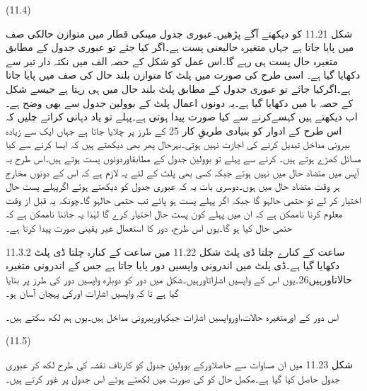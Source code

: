  
(11.4)
 
	شکل 11.21 کو دیکھتے آگے پڑھیں۔عبوری جدول میںکی قطار میں متوازن حالکی صف میں پایا جاتا ہے جہاں متغیرہ حالیعنی پست ہے۔اگر کیا جئے تو عبوری جدول کے مطابق متغیرہ حال پست ہی رہے گا۔اس عمل کو شکل کے حصہ الف میں نکتہ دار تیر سے دکھایا گیا ہے۔
	اسی طرح  کی صورت میں پلٹ کا متوازن بلند حال  کی صف میں پایا جاتا ہے۔اگرکیا جائے تو عبوری جدول کے مطابق پلٹ بلند حال میں ہی رہتا ہے جیسے شکل کے حصہ با میں دکھایا گیا ہے۔یہ دونوں اعمال پلٹ کے بوولین جدول سے بھی وضح ہے۔
	اب دیکھتے ہیں کہسےکرنے سے کیا صورت پیدا ہوتی ہے۔پہلے تو یاد دہانی کراتے چلیں کہ اس طرح کے ادوار کو بنیادی طریقِ کار 25 کے طرز پر چلایا جاتا ہے جہاں ایک سے زیادہ بیرونی مداخل تبدیل کرنے کی اجازت نہیں ہوتی۔بہرحال پھر بھی دیکھتے ہیں کہ ایسا کرنے سے کیا مسائل کھڑے ہوتے ہیں۔
	کرنے سے پہلے تو بوولین جدول کے مطابقاوردونوں پست ہوتے ہیں۔اس طرح یہ آپس میں متضاد حال میں نہیں ہوتے جبکہ کسی بھی پلٹ کے لئے یہ لازم ہے کہ اس کے دونوں مخارج ہر وقت متضاد حال میں ہوں۔دوسری بات یہ کہ عبوری جدول کو دیکھتے ہوئے اگرپہلے پست حال اختیار کر لے تو حتمی حالہو گا جبکہ اگر پہلے پست ہو پائے تب حتمی حالہو گا۔چونکہ یہ قبل از وقت معلوم کرنا ناممکن ہے کہ ان میں پہلے کون پست حال اختیار کرے گا لہٰذا یہ جاننا ناممکن ہے کہ حتمی حال کیا ہو گا۔یوں اس طرح، دور کا استعمال غیر یقینی صورت پیدا کرتا ہے۔

11.3.2 ساعت کے کنارے چلتا ڈی پلٹ
	شکل 11.22 میں ساعت کے کنارہ چلتا ڈی پلٹ دکھایا گیا ہے۔ڈی پلٹ میں اندرونی واپسیں دور پایا جاتا ہے جس کے اندرونی متغیرہ حالاتاورہیں26۔یوں اس کے واپسیں اشاراتاورہیں۔شکل میں دور کو دوبارہ واپسیں دور کی طرز پر بنایا گیا ہے تا کہ واپسیں اشارات اورکی پہچان آسان ہو۔



	اس دور کے اورمتغیرہ حالات،اورواپسیں اشارات  جبکہاوربیرونی مداخل ہیں۔یوں ہم لکھ سکتے ہیں۔

 
(11.5)

	شکل 11.23 میں ان مساوات سے حاصلاورکے بوولین جدول  کو کارناف نقشہ کی طرح لکھ کر عبوری جدول حاصل کیا گیا ہے۔مکمل حال کو کی صورت میں لکھتے ہوئے اس جدول پر غور کرتے ہیں۔


